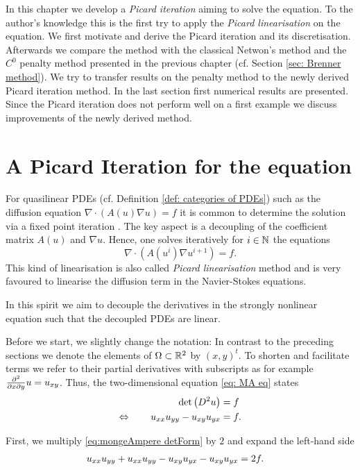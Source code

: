 In this chapter we develop a \emph{Picard iteration} aiming to solve the \MA equation. To the author's knowledge this is the first try to apply the \emph{Picard linearisation} on the \MA equation. 
We first motivate and derive the Picard iteration and its discretisation.
Afterwards we compare the method with the classical Netwon's method and the $C^0$ penalty method presented in the previous chapter (cf. Section \ref{sec: Brenner method}). We try to transfer results on the penalty method to the newly derived Picard iteration method. 
In the last section first numerical results are presented. Since the Picard iteration does not perform well on a first example we discuss improvements of the newly derived method.


\section{A Picard Iteration for the \MA equation} \label{sec: motivation picard iteration}
For quasilinear PDEs (cf. Definition \ref{def: categories of PDEs}) such as the diffusion equation $\nabla \cdot (A(u) \nabla u ) = f$ it is common to determine the solution via a fixed point iteration \cite{Deblois1997,LL1995,MNK2009}. The key aspect is a decoupling of the coefficient matrix $A(u)$ and $\nabla u$. Hence, one solves iteratively for $i\in \mathbb{N}$ the equations
\[
	\nabla \cdot (A(u^{i} )\nabla u^{i+1}) = f. %
\] 
This kind of linearisation is also called \emph{Picard linearisation} method and is very favoured to linearise the diffusion term in the Navier-Stokes equations.

In this spirit we aim to decouple the derivatives in the strongly nonlinear \MA equation such that the decoupled PDEs are linear. 

Before we start, we slightly change the notation: In contrast to the preceding sections we denote the elements of $\Omega \subset \mathbb{R}^2$ by  $(x,y)^t$. To shorten and facilitate terms we refer to their partial derivatives with subscripts as for example $\frac {\partial^2} {\partial x\partial y} u = u_{xy}$.
Thus, the two-dimensional \MA equation \eqref{eq: MA eq} states
\begin{align}
 \det{\left(D^2 u\right)} &= f \nonumber \\
 	\Leftrightarrow \qquad  u_{x x }  u_{y y }  -u_{x y } u_{y x } &= f. \label{eq:mongeAmpere detForm}
\end{align}

First, we multiply \eqref{eq:mongeAmpere detForm} by $2$ and expand the left-hand side
\begin{align}
 	u_{x x } u_{y y }+u_{x x } u_{y y } -u_{x y } u_{y x } -u_{x y } u_{y x } &=2 f. 
\end{align}

